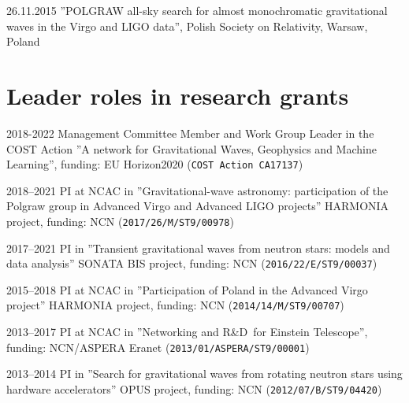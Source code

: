 \documentclass[]{friggeri-cv} %
\begin{document}
\begin{entrylistoc}
\entrys
{26.11.2015}
{''POLGRAW all-sky search for almost monochromatic gravitational waves in the Virgo and LIGO data'', Polish Society on Relativity, Warsaw, Poland}




\end{entrylistoc}

% 
\vskip 0.5cm 
\section{Leader roles in research grants} 
\begin{entrylistoc}

\entrys 
{2018-2022} 
{Management Committee Member and Work Group Leader in the COST Action ''A network for Gravitational Waves, Geophysics and Machine Learning'', funding: EU Horizon2020 ({\tt COST Action CA17137}) } 
   
\entrys
{2018--2021}
{PI at NCAC in ''Gravitational-wave astronomy: participation of the Polgraw group in Advanced Virgo and Advanced LIGO projects'' HARMONIA project, funding: NCN ({\tt 2017/26/M/ST9/00978})}

\entrys
{2017--2021} 
{PI in ''Transient gravitational waves from neutron stars: models and data analysis'' SONATA BIS project, funding: NCN ({\tt 2016/22/E/ST9/00037})} 

\entrys
{2015--2018} 
{PI at NCAC in ''Participation of Poland in the Advanced Virgo project'' HARMONIA project, funding: NCN ({\tt 2014/14/M/ST9/00707})} 

\entrys
{2013--2017}
{PI at NCAC in ''Networking and R\&D for Einstein Telescope'', funding: NCN/ASPERA Eranet ({\tt 2013/01/ASPERA/ST9/00001})}

\entrys
{2013--2014}
{PI in ''Search for gravitational waves from rotating neutron stars using hardware accelerators'' OPUS project, funding: NCN ({\tt 2012/07/B/ST9/04420})} 

\end{entrylistoc}
\end{document}
